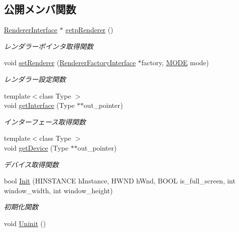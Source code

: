 \subsection*{公開メンバ関数}
\begin{DoxyCompactItemize}
\item 
\mbox{\hyperlink{class_renderer_interface}{Renderer\+Interface}} $\ast$ \mbox{\hyperlink{class_renderer_a1c49b796eff197f77ef3f75757f7d468}{getp\+Renderer}} ()
\begin{DoxyCompactList}\small\item\em レンダラーポインタ取得関数 \end{DoxyCompactList}\item 
void \mbox{\hyperlink{class_renderer_a02e3c483b2c9d8024e51639a06159066}{set\+Renderer}} (\mbox{\hyperlink{class_renderer_factory_interface}{Renderer\+Factory\+Interface}} $\ast$factory, \mbox{\hyperlink{class_renderer_ab5a9379ccadcf2b3394c61cf8c835fec}{M\+O\+DE}} mode)
\begin{DoxyCompactList}\small\item\em レンダラー設定関数 \end{DoxyCompactList}\item 
{\footnotesize template$<$class Type $>$ }\\void \mbox{\hyperlink{class_renderer_ae7155d5c9df23afd21082c08931a2e72}{get\+Interface}} (Type $\ast$$\ast$out\+\_\+pointer)
\begin{DoxyCompactList}\small\item\em インターフェース取得関数 \end{DoxyCompactList}\item 
{\footnotesize template$<$class Type $>$ }\\void \mbox{\hyperlink{class_renderer_a0f82c27d785abaee2d8014ad56eddeba}{get\+Device}} (Type $\ast$$\ast$out\+\_\+pointer)
\begin{DoxyCompactList}\small\item\em デバイス取得関数 \end{DoxyCompactList}\item 
bool \mbox{\hyperlink{class_renderer_a8d576add80187f5be3f24ec6a8108100}{Init}} (H\+I\+N\+S\+T\+A\+N\+CE h\+Instance, H\+W\+ND h\+Wnd, B\+O\+OL is\+\_\+full\+\_\+screen, int window\+\_\+width, int window\+\_\+height)
\begin{DoxyCompactList}\small\item\em 初期化関数 \end{DoxyCompactList}\item 
void \mbox{\hyperlink{class_renderer_ae865246d6a04d467ac22458f6f5f69d4}{Uninit}} ()

\end{DoxyCompactItemize}
